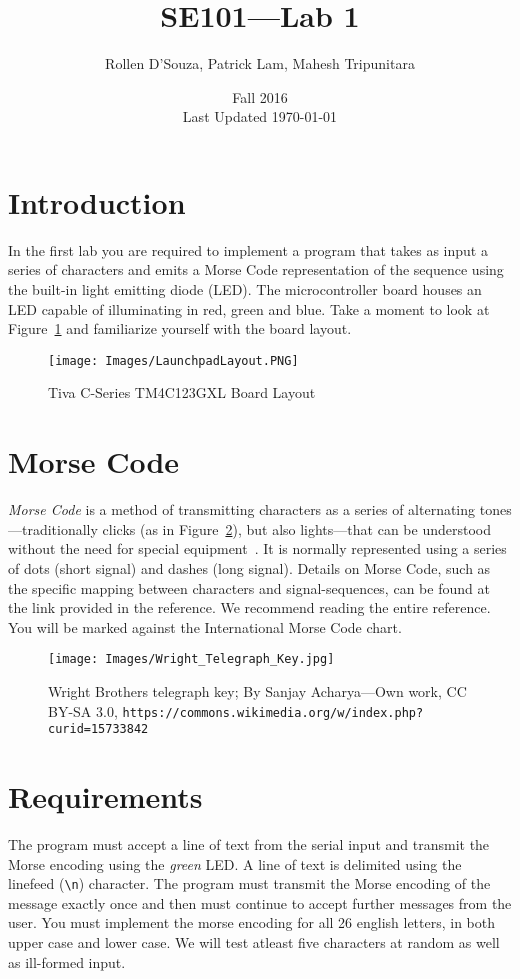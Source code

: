 \documentclass{article}
\begin{document}
\title{SE101---Lab 1}
\author{Rollen D'Souza, Patrick Lam, Mahesh Tripunitara}
\date{Fall 2016\\Last Updated \today}
\maketitle

\section*{Introduction}
In the first lab you are required to implement a program that takes as input a series of characters and emits a Morse Code representation of the sequence using the built-in light emitting diode (LED). The microcontroller board houses an LED capable of illuminating in red, green and blue.  Take a moment to look at Figure~\ref{fig:tivaLayout} and familiarize yourself with the board layout.

\begin{figure}[ht]
\centering
\texttt{[image: Images/LaunchpadLayout.PNG]}
\caption{Tiva C-Series TM4C123GXL Board Layout~\cite{tivaGuide}}
\label{fig:tivaLayout}
\end{figure}

\section*{Morse Code}
\emph{Morse Code} is a method of transmitting characters as a series of alternating tones---traditionally clicks (as in Figure~\ref{fig:key}), but also lights---that can be understood without the need for special equipment~\cite{wiki_morse}.  It is normally represented using a series of dots (short signal) and dashes (long signal).  Details on Morse Code, such as the specific mapping between characters and signal-sequences, can be found at the link provided in the reference.  We recommend reading the entire reference.  You will be marked against the International Morse Code chart.

\begin{figure}[ht]
\centering
\texttt{[image: Images/Wright\_Telegraph\_Key.jpg]}
\caption{Wright Brothers telegraph key; By Sanjay Acharya---Own work, CC BY-SA 3.0, \texttt{https://commons.wikimedia.org/w/index.php?curid=15733842}}
\label{fig:key}
\end{figure}


\section*{Requirements}
The program must accept a line of text from the serial input and transmit the Morse encoding using the \emph{green} LED.  A line of text is delimited using the linefeed (\texttt{\textbackslash n}) character.  The program must transmit the Morse encoding of the message exactly once and then must continue to accept further messages from the user.  You must implement the morse encoding for all 26 english letters, in both upper case and lower case.  We will test atleast five characters at random as well as ill-formed input.
\end{document}
